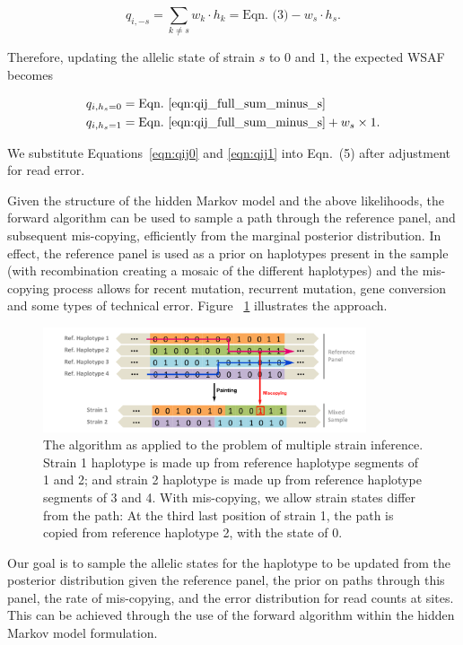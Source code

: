 \documentclass{article}
\begin{document}
\begin{equation}
q_{i,-s} = \sum_{k\neq s} w_k \cdot h_k = \textrm{Eqn.~(3)} -  w_s \cdot h_s. \label{eqn:qij_full_sum_minus_s}
\end{equation}

\noindent Therefore, updating the allelic state of strain $s$ to $0$ and $1$, the expected WSAF becomes

\begin{align}
q_{i,h_s=0} & = \textrm{Eqn.~\eqref{eqn:qij_full_sum_minus_s}} \label{eqn:qij0}\\
q_{i,h_s=1} & = \textrm{Eqn.~\eqref{eqn:qij_full_sum_minus_s}} + w_s \times 1. \label{eqn:qij1}
\end{align}

\noindent We substitute Equations~\eqref{eqn:qij0} and \eqref{eqn:qij1} into Eqn.~(5) after adjustment for read error.

Given the structure of the hidden Markov model and the above likelihoods, the forward algorithm can be used to sample a path through the reference panel, and subsequent mis-copying, efficiently from the marginal posterior distribution.  In effect, the reference panel is used as a prior on haplotypes present in the sample (with recombination creating a mosaic of the different haplotypes) and the mis-copying process allows for recent mutation, recurrent mutation, gene conversion and some types of technical error.  Figure ~\ref{fig:ls} illustrates the approach.


\begin{figure}[tbh]
\centering
\includegraphics[width=0.85\textwidth]{Fig1.pdf}
\caption{The \citet{Li2003} algorithm as applied to the problem of multiple strain inference. Strain 1 haplotype is made up from reference haplotype segments of 1 and 2; and strain 2 haplotype is made up from reference haplotype segments of 3 and 4. With mis-copying, we allow strain states differ from the path: At the third last position of strain 1, the path is copied from reference haplotype 2, with the state of 0.}
\label{fig:ls}
\end{figure}


Our goal is to sample the allelic states for the haplotype to be updated from the posterior distribution given the reference panel, the prior on paths through this panel, the rate of mis-copying, and the error distribution for read counts at sites.  This can be achieved through the use of the forward algorithm within the hidden Markov model formulation.
\end{document}
